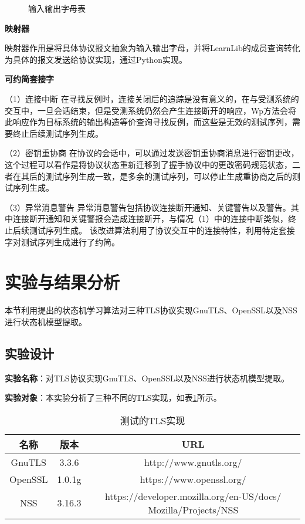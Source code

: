 \begin{figure}[htp]
	\centering
	\caption{输入输出字母表}
	
	\label{fig:chap04-alphabet}
\end{figure}


\textbf{映射器}

映射器作用是将具体协议报文抽象为输入输出字母，并将LearnLib的成员查询转化为具体的报文发送给协议实现，通过Python实现。

\textbf{可约简套接字}

（1）连接中断
在寻找反例时，连接关闭后的追踪是没有意义的，在与受测系统的交互中，一旦会话结束，但是受测系统仍然会产生连接断开的响应，Wp方法会将此响应作为目标系统的输出构造等价查询寻找反例，而这些是无效的测试序列，需要终止后续测试序列生成。

（2）密钥重协商
在协议的会话中，可以通过发送密钥重协商消息进行密钥更改，这个过程可以看作是将协议状态重新迁移到了握手协议中的更改密码规范状态，二者在其后的测试序列生成一致，是多余的测试序列，可以停止生成重协商之后的测试序列生成。

（3）异常消息警告
异常消息警告包括协议连接断开通知、关键警告以及警告。其中连接断开通知和关键警报会造成连接断开，与情况（1）中的连接中断类似，终止后续测试序列生成。
该改进算法利用了协议交互中的连接特性，利用特定套接字对测试序列生成进行了约简。



\section{实验与结果分析}
本节利用提出的状态机学习算法对三种TLS协议实现GnuTLS、OpenSSL以及NSS进行状态机模型提取。

\subsection{实验设计}

\textbf{实验名称}：对TLS协议实现GnuTLS、OpenSSL以及NSS进行状态机模型提取。

\textbf{实验对象}：本实验分析了三种不同的TLS实现，如表\ref{table:chap04-implementations}所示。
\begin{table}[htb]
  \centering
  \caption{测试的TLS实现}
\begin{tabular}{|c|c|c|}
  \hline
  名称 		& 版本 		& URL  \\
  \hline
  GnuTLS 	& 3.3.6 		& http://www.gnutls.org/  \\
  \hline
  OpenSSL 	& 1.0.1g 	& https://www.openssl.org/ \\
  \hline
  NSS 		& 3.16.3    & https://developer.mozilla.org/en-US/docs/
Mozilla/Projects/NSS \\
  \hline



\end{tabular}
\label{table:chap04-implementations}
\end{table}


